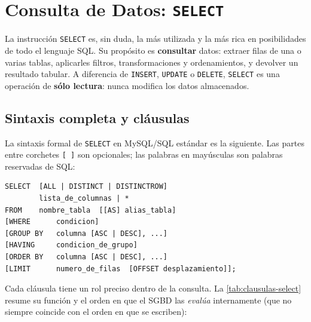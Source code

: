 \section{Consulta de Datos: \texttt{SELECT}}

La instrucción \texttt{SELECT} es, sin duda, la más utilizada y la
más rica en posibilidades de todo el lenguaje SQL.
Su propósito es \textbf{consultar} datos: extraer filas de una o
varias tablas, aplicarles filtros, transformaciones y ordenamientos,
y devolver un resultado tabular.
A diferencia de \texttt{INSERT}, \texttt{UPDATE} o \texttt{DELETE},
\texttt{SELECT} es una operación de \textbf{sólo lectura}: nunca
modifica los datos almacenados.

\subsection{Sintaxis completa y cláusulas}

La sintaxis formal de \texttt{SELECT} en MySQL/SQL estándar es la
siguiente.
Las partes entre corchetes \texttt{[ ]} son opcionales; las palabras
en mayúsculas son palabras reservadas de SQL:

\begin{lstlisting}[caption={Sintaxis completa de SELECT.}]
SELECT  [ALL | DISTINCT | DISTINCTROW]
        lista_de_columnas | *
FROM    nombre_tabla  [[AS] alias_tabla]
[WHERE      condicion]
[GROUP BY   columna [ASC | DESC], ...]
[HAVING     condicion_de_grupo]
[ORDER BY   columna [ASC | DESC], ...]
[LIMIT      numero_de_filas  [OFFSET desplazamiento]];
\end{lstlisting}

Cada cláusula tiene un rol preciso dentro de la consulta.
La \cref{tab:clausulas-select} resume su función y el orden en que
el SGBD las \textit{evalúa} internamente (que no siempre coincide
con el orden en que se escriben):


